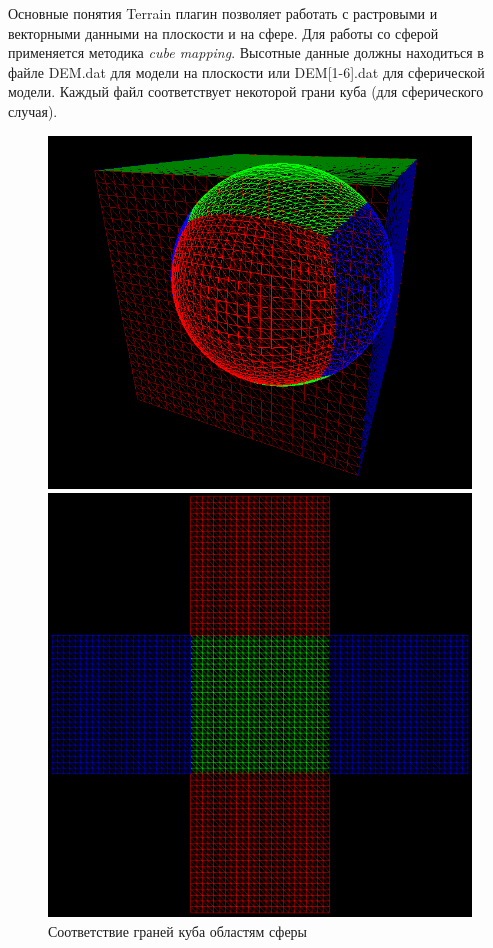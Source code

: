 \documentclass[12pt]{article}
\begin{document}
\begin{section}{Основные понятия}
Terrain плагин позволяет работать с растровыми и векторными данными на плоскости и на сфере. Для работы со сферой применяется методика \textit{cube mapping}. Высотные данные должны находиться в файле DEM.dat для модели на плоскости или DEM[1-6].dat для сферической модели. Каждый файл соответствует некоторой грани куба (для сферического случая).

\begin{figure}[h]
    \centering
    \begin{minipage}{0.45\textwidth}
        \centering
        \includegraphics[width=\linewidth]{cube_mapping}
        \caption{Соответствие граней куба областям сферы}
        \label{fig:mapping}
    \end{minipage}\hfill
    \begin{minipage}{0.45\textwidth}
    \centering
        \includegraphics[width=\linewidth]{cube_net}

\end{minipage}
\end{figure}
\end{section}
\end{document}
